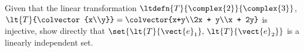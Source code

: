 Given that the linear transformation $\ltdefn{T}{\complex{2}}{\complex{3}}$, 
$\lt{T}{\colvector{x\\y}} = \colvector{x+y\\2x + y\\x + 2y}$ is injective, show directly that 
$\set{
\lt{T}{\vect{e}_1},\,
\lt{T}{\vect{e}_2}
}$ 
is a linearly independent set.
